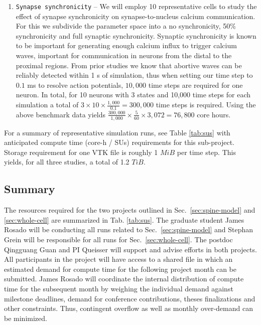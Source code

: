\begin{enumerate}[resume]

\item \texttt{Synapse synchronicity} -- We will employ 10 representative cells to study the effect of synapse synchronicity on synapse-to-nucleus calcium communication. For this we subdivide the parameter space into a no synchronicity, 50\% synchronicity and full synaptic synchronicity. Synaptic synchronicity is known to be important for generating enough calcium influx to trigger calcium waves, important for communication in neurons from the distal to the proximal regions. From prior studies we know that abortive waves can be reliably detected within 1 s of simulation, thus when setting our time step to $0.1$ ms to resolve action potentials, $10,000$ time steps are required for one neuron. In total, for 10 neurons with 3 states and 10,000 time steps for each simulation a total of $3 \times 10 \times \frac{1,000}{0.1} = 300,000$ time steps is required. Using the above benchmark data yields $\frac{300,000}{1,000} \times \frac{5}{60} \times 3,072 = 76,800$ core hours.
\end{enumerate}
For a summary of representative simulation runs, see Table \ref{tab:sus} with 
anticipated compute time (core-h / SUs) requirements for this sub-project. Storage requirement for one VTK file is roughly 1 $MiB$ per time step. This yields, for all three studies, a total of 1.2 $TiB$.  
\subsection{Summary}
The resources required for the two projects outlined in Sec.~\ref{sec:spine-model} and \ref{sec:whole-cell} are summarized in Tab. \ref{tab:sus}. The graduate student James Rosado will be conducting all runs related to Sec.~\ref{sec:spine-model} and Stephan Grein will be responsible for all runs for Sec.~\ref{sec:whole-cell}. The postdoc Qingguang Guan and PI Queisser will support and advise efforts in both projects. \\
All participants in the project will have access to a shared file in which an estimated demand for compute time for the following project month can be submitted. James Rosado will coordinate the internal distribution of compute time for the subsequent month by weighing the individual demand against milestone deadlines, demand for conference contributions, theses finalizations and other constraints. Thus, contingent overflow as well as monthly over-demand can be minimized.

